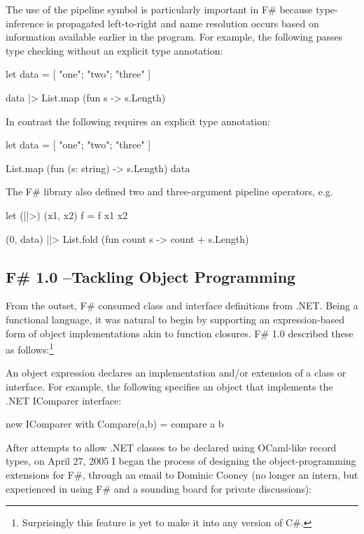 \documentclass[acmsmall,review]{acmart}\settopmatter{printfolios=true,printccs=false,printacmref=false}
\begin{document}
The use of the pipeline symbol is particularly important in F\# because type-inference is propagated left-to-right and name resolution occurs based on information available earlier in the program.  For example, the following passes type checking without an explicit type annotation:
\begin{verbquote}
let data = [ "one"; "two"; "three" ] 

data |> List.map (fun s -> s.Length)
\end{verbquote}
In contrast the following requires an explicit type annotation:
\begin{verbquote}
let data = [ "one"; "two"; "three" ] 

List.map (fun (s: string) -> s.Length) data
\end{verbquote}
The F\# library also defined two and three-argument pipeline operators, e.g.
\begin{verbquote}
    let (||>) (x1, x2) f = f x1 x2

    (0, data) ||> List.fold (fun count s -> count + s.Length)
\end{verbquote}

\subsection*{F\# 1.0 –Tackling Object Programming}

From the outset, F\# consumed class and interface definitions from .NET. Being a functional language, it was
natural to begin by supporting an expression-based form of object implementations akin to function closures.  F\# 1.0 described these as follows:\footnote{Surprisingly this feature is yet to make it into any version of C\#.}
\begin{verbquote}
An object expression declares an implementation and/or extension of a class or interface. For example, the following specifies an object that implements the .NET IComparer interface:
\end{verbquote}
\begin{verb}
    { new IComparer with Compare(a,b) = compare a b }
\end{verb}

After attempts to allow .NET classes to be declared using OCaml-like record types, on April 27, 2005 I began the process of designing the object-programming extensions for F\#, through an email to Dominic Cooney (no longer an intern, but experienced in using F\# and a sounding board for private discussions):
\end{document}
